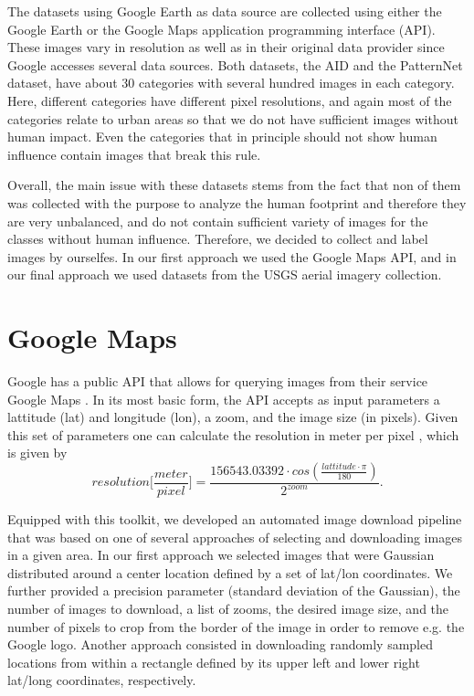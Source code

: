 The datasets using Google Earth as data source are collected using either the Google Earth or the Google Maps application programming interface (API). These images vary in resolution as well as in their original data provider since Google accesses several data sources. 
Both datasets, the AID and the PatternNet dataset, have about 30 categories with several hundred images in each category. Here, different categories have different pixel resolutions, and again most of the categories relate to urban areas so that we do not have sufficient images without human impact. Even the categories that in principle should not show human influence contain images that break this rule.

Overall, the main issue with these datasets stems from the fact that non of them was collected with the purpose to analyze the human footprint and therefore they are very unbalanced, and do not contain sufficient variety of images for the classes without human influence. Therefore, we decided to collect and label images by ourselfes. In our first approach we used the Google Maps API, and in our final approach we used datasets from the USGS aerial imagery collection.

\section{Google Maps}

Google has a public API that allows for querying images from their service Google Maps \parencite{google_maps_api}. In its most basic form, the API accepts as input parameters a lattitude (lat) and longitude (lon), a zoom, and the image size (in pixels). Given this set of parameters one can calculate the resolution in meter per pixel \parencite{gmaps_res_per_m}, which is given by
\begin{equation}
resolution \Big[\frac{meter}{pixel}\Big] = \frac{156543.03392 \cdot cos(\frac{lattitude \cdot \pi}{180})}{2 ^ {zoom}}.
\label{eq:gmaps_res_per_m}
\end{equation}

Equipped with this toolkit, we developed an automated image download pipeline that was based on one of several approaches of selecting and downloading images in a given area. In our first approach we selected images that were Gaussian distributed around a center location defined by a set of lat/lon coordinates. We further provided a precision parameter (standard deviation of the Gaussian), the number of images to download, a list of zooms, the desired image size, and the number of pixels to crop from the border of the image in order to remove e.g. the Google logo. Another approach consisted in downloading randomly sampled locations from within a rectangle defined by its upper left and lower right lat/long coordinates, respectively.

